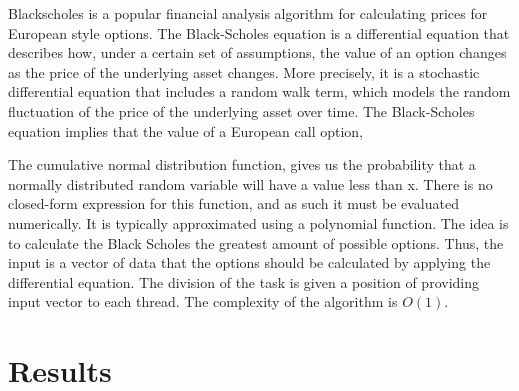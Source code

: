 \documentclass[journal]{IEEEtran}
\begin{document}
Blackscholes is a popular financial analysis algorithm for calculating prices
for European style options. The Black-Scholes equation is a differential
equation that describes how, under a certain set of assumptions, the value of an
option changes as the price of the underlying asset changes. More precisely, it
is a stochastic differential equation that includes a random walk term, which
models the random fluctuation of the price of the underlying asset over time.
The Black-Scholes equation implies that the value of a European call option, 






The cumulative normal distribution function, gives us the probability that a
normally distributed random variable will have a value less than x. There is no
closed-form expression for this function, and as such it must be evaluated
numerically. It is typically approximated using a polynomial function. The idea is to calculate the Black Scholes the greatest amount of possible options. Thus, the input is a vector of data that the options should be calculated by applying the differential equation. The division of the task is given a position of providing input vector to each thread. The complexity of the algorithm is $O(1)$.



\section{Results}

\end{document}

